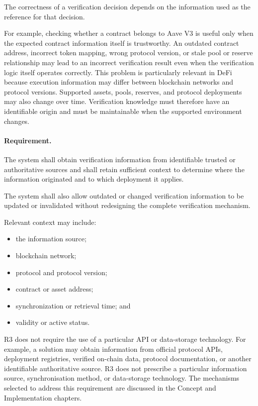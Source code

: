 The correctness of a verification decision depends on the information used as
the reference for that decision.

For example, checking whether a contract belongs to Aave V3 is useful only when
the expected contract information itself is trustworthy. An outdated contract
address, incorrect token mapping, wrong protocol version, or stale pool or
reserve relationship may lead to an incorrect verification result even when the
verification logic itself operates correctly. This problem is particularly relevant in DeFi because execution information may
differ between blockchain networks and protocol versions. Supported assets,
pools, reserves, and protocol deployments may also change over time. Verification knowledge must therefore have an identifiable origin and must be
maintainable when the supported environment changes.

\paragraph{Requirement.}

The system shall obtain verification information from identifiable trusted or
authoritative sources and shall retain sufficient context to determine where
the information originated and to which deployment it applies.

The system shall also allow outdated or changed verification information to be
updated or invalidated without redesigning the complete verification mechanism.

Relevant context may include:

\begin{itemize}
    \item the information source;
    \item blockchain network;
    \item protocol and protocol version;
    \item contract or asset address;
    \item synchronization or retrieval time; and
    \item validity or active status.
\end{itemize}

R3 does not require the use of a particular API or data-storage technology.
For example, a solution may obtain information from official protocol APIs,
deployment registries, verified on-chain data, protocol documentation, or
another identifiable authoritative source. R3 does not prescribe a particular information source,
synchronisation method, or data-storage technology.
The mechanisms selected to address this requirement
are discussed in the Concept and Implementation chapters.



